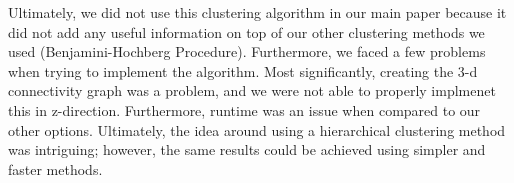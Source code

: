 \par Ultimately, we did not use this clustering algorithm in our main paper
because it did not add any useful information on top of our other clustering
methods we used (Benjamini-Hochberg Procedure). Furthermore, we faced a few
problems when trying to implement the algorithm. Most significantly, creating
the 3-d connectivity graph was a problem, and we were not able to properly
implmenet this in z-direction. Furthermore, runtime was an issue when compared
to our other options. Ultimately, the idea around using a hierarchical
clustering method was intriguing; however, the same results could be achieved
using simpler and faster methods.
